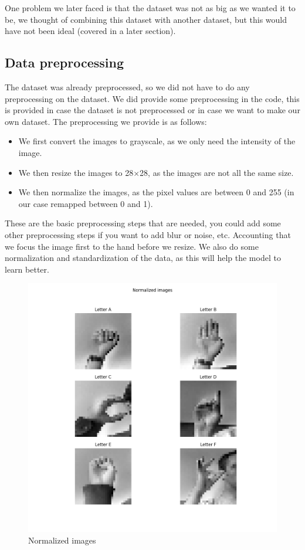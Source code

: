 \documentclass[../paper.tex]{subfiles}
\begin{document}
    One problem we later faced is that the dataset was not as big as we wanted it to be,
    we thought of combining this dataset with another dataset, but this would have not been ideal (covered in a later section).

    \subsection{Data preprocessing}
    The dataset was already preprocessed, so we did not have to do any preprocessing on the dataset. 
    We did provide some preprocessing in the code, this is provided in case the dataset is not preprocessed or in case we want to make our own dataset.
    The preprocessing we provide is as follows:
    \begin{itemize} 
        \item We first convert the images to grayscale, as we only need the intensity of the image.
        \item We then resize the images to 28$\times$28, as the images are not all the same size.
        \item We then normalize the images, as the pixel values are between 0 and 255 (in our case remapped between 0 and 1).
    \end{itemize} 
    These are the basic preprocessing steps that are needed, you could add some other preprocessing steps if you want to add blur or noise, etc.
    Accounting that we focus the image first to the hand before we resize.
    We also do some normalization and standardization of the data, as this will help the model to learn better. 
    \begin{figure}[h]
        \centering
        \includegraphics[width=\linewidth]{letters_grid_normalized_6}
        \caption{Normalized images}
        \label{fig:normalized_images}
    \end{figure}
\end{document}
